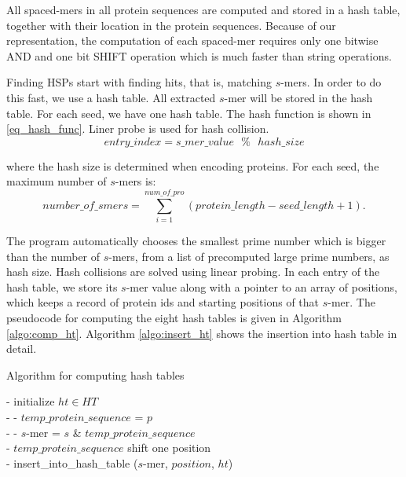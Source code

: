 All spaced-mers in all protein sequences are computed and stored in a hash table, together with their location in the protein sequences. Because of our representation, the computation of each spaced-mer requires only one bitwise AND and one bit SHIFT operation which is much faster than string operations. 

Finding HSPs start with finding hits, that is, matching $s$-mers. In order to do this fast, we use a hash table. All extracted $s$-mer will be stored in the hash table. For each seed, we have one hash table. The hash function is shown in \ref{eq_hash_func}. Liner probe is used for hash collision.  
\begin{equation}
entry\_index = s\_mer\_value \text{ }\%\text{ } hash\_size
\label{eq_hash_func}
\end{equation}

where the hash size is determined when encoding proteins. For each seed, the maximum number of $s$-mers is:
\begin{displaymath}
number{\_}of{\_}smers = \sum_{i=1}^{num\_of\_pro} (protein\_length - seed\_length +1).
\end{displaymath}

The program automatically chooses the smallest prime number which is bigger than the number of $s$-mers, from a list of precomputed large prime numbers, as hash size. Hash collisions are solved using linear probing. In each entry of the hash table, we store its $s$-mer value along with a pointer to an array of positions, which keeps a record of protein ids and starting positions of that $s$-mer. The pseudocode for computing the eight hash tables is given in Algorithm  \ref{algo:comp_ht}. Algorithm \ref{algo:insert_ht} shows the insertion into hash table in detail.

\begin{algorithm}[h!]
 \SetAlgoLined 
\caption{Algorithm for computing hash tables \label{algo:comp_ht}}
 {
 	- initialize $ht\in HT$\\
 	- 
 	{
 		- $temp\_protein\_sequence$ = $p$\\
 		- 
 		{
			- $s$-mer = $s$ \& $temp\_protein\_sequence$\\
			- $temp\_protein\_sequence$ shift one position\\
			- insert\_into\_hash\_table ($s$-mer, $position$, $ht$)
 		}
 	}
 }
\end{algorithm}

